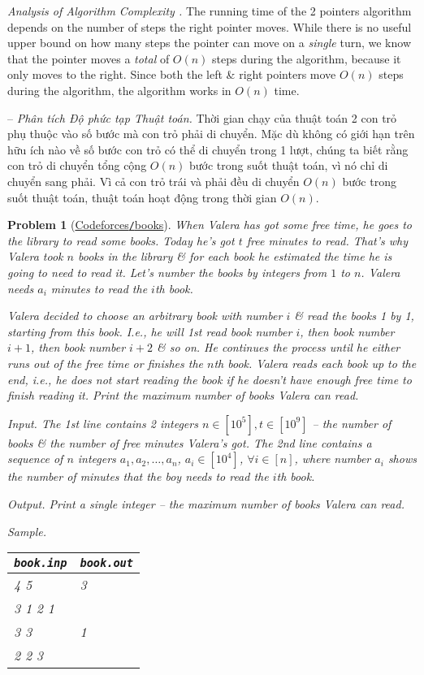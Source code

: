 \documentclass{article}
\newtheorem{problem}{Problem}
\begin{document}
{\it Analysis of Algorithm Complexity .} The running time of the 2 pointers algorithm depends on the number of steps the right pointer moves. While there is no useful upper bound on how many steps the pointer can move on a {\it single} turn, we know that the pointer moves a {\it total} of $O(n)$ steps during the algorithm, because it only moves to the right. Since both the left \& right pointers move $O(n)$ steps during the algorithm, the algorithm works in $O(n)$ time.

-- {\it Phân tích Độ phức tạp Thuật toán.} Thời gian chạy của thuật toán 2 con trỏ phụ thuộc vào số bước mà con trỏ phải di chuyển. Mặc dù không có giới hạn trên hữu ích nào về số bước con trỏ có thể di chuyển trong 1 lượt, chúng ta biết rằng con trỏ di chuyển tổng cộng $O(n)$ bước trong suốt thuật toán, vì nó chỉ di chuyển sang phải. Vì cả con trỏ trái và phải đều di chuyển $O(n)$ bước trong suốt thuật toán, thuật toán hoạt động trong thời gian $O(n)$.

\begin{problem}[\href{https://codeforces.com/contest/279/problem/B}{Codeforces{\tt/}books}]
    When Valera has got some free time, he goes to the library to read some books. Today he's got $t$ free minutes to read. That's why Valera took $n$ books in the library \& for each book he estimated the time he is going to need to read it. Let's number the books by integers from $1$ to $n$. Valera needs $a_i$ minutes to read the $i$th book.

    Valera decided to choose an arbitrary book with number $i$ \& read the books 1 by 1, starting from this book. I.e., he will 1st read book number $i$, then book number $i + 1$, then book number $i + 2$ \& so on. He continues the process until he either runs out of the free time or finishes the $n$th book. Valera reads each book up to the end, i.e., he does not start reading the book if he doesn't have enough free time to finish reading it. Print the maximum number of books Valera can read.
    \item {\sf Input.} The 1st line contains 2 integers $n\in[10^5],t\in[10^9]$ -- the number of books \& the number of free minutes Valera's got. The 2nd line contains a sequence of $n$ integers $a_1,a_2,\ldots,a_n$, $a_i\in[10^4]$, $\forall i\in[n]$, where number $a_i$ shows the number of minutes that the boy needs to read the $i$th book.
    \item {\sf Output.} Print a single integer -- the maximum number of books Valera can read.
    \item {\sf Sample.}
    \begin{table}[H]
        \centering
        \begin{tabular}{|l|l|}
            \hline
            \verb|book.inp| & \verb|book.out| \\
            \hline
            4 5 & 3 \\
            3 1 2 1 & \\
            \hline
            3 3 & 1 \\
            2 2 3 & \\
            \hline
        \end{tabular}
    \end{table}
\end{problem}
\end{document}
